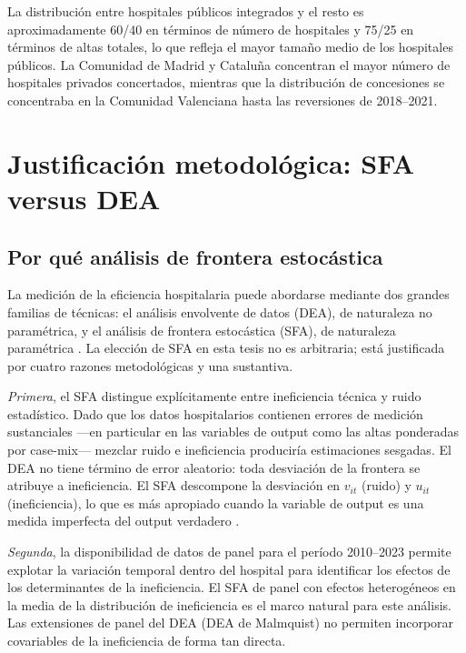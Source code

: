 \documentclass[12pt, a4paper, twoside, openright]{book}
\theoremstyle{plain}
\theoremstyle{definition}
\theoremstyle{remark}
\begin{document}
La distribución entre hospitales públicos integrados y el resto es aproximadamente 60/40 en términos de número de hospitales y 75/25 en términos de altas totales, lo que refleja el mayor tamaño medio de los hospitales públicos. La Comunidad de Madrid y Cataluña concentran el mayor número de hospitales privados concertados, mientras que la distribución de concesiones se concentraba en la Comunidad Valenciana hasta las reversiones de 2018--2021.

\section{Justificación metodológica: SFA versus DEA}
\label{sec:justificacion_metodologica}

\subsection{Por qué análisis de frontera estocástica}

La medición de la eficiencia hospitalaria puede abordarse mediante dos grandes familias de técnicas: el análisis envolvente de datos (DEA), de naturaleza no paramétrica, y el análisis de frontera estocástica (SFA), de naturaleza paramétrica \citep{coelli2005}. La elección de SFA en esta tesis no es arbitraria; está justificada por cuatro razones metodológicas y una sustantiva.

\textit{Primera}, el SFA distingue explícitamente entre ineficiencia técnica y ruido estadístico. Dado que los datos hospitalarios contienen errores de medición sustanciales ---en particular en las variables de output como las altas ponderadas por case-mix--- mezclar ruido e ineficiencia produciría estimaciones sesgadas. El DEA no tiene término de error aleatorio: toda desviación de la frontera se atribuye a ineficiencia. El SFA descompone la desviación en $v_{it}$ (ruido) y $u_{it}$ (ineficiencia), lo que es más apropiado cuando la variable de output es una medida imperfecta del output verdadero \citep{aigner1977,meeusen1977,kumbhakar2000}.

\textit{Segunda}, la disponibilidad de datos de panel para el período 2010--2023 permite explotar la variación temporal dentro del hospital para identificar los efectos de los determinantes de la ineficiencia. El SFA de panel con efectos heterogéneos en la media de la distribución de ineficiencia \citep{battese1995,wang2002} es el marco natural para este análisis. Las extensiones de panel del DEA (DEA de Malmquist) no permiten incorporar covariables de la ineficiencia de forma tan directa.
\end{document}
